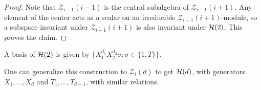 \begin{proof}
  Note that $\mathcal{Z}_{i - 1}(i - 1)$
  is the central subalgebra of
  $\mathcal{Z}_{i - 1}(i + 1)$. Any element
  of the center acts as a scalar
  on an irreducible $\mathcal{Z}_{i - 1}(i + 1)$-module,
  so a subspace invariant under
  $\mathcal{Z}_{i - 1}(i + 1)$ is
  also invariant under $\mathcal{H}(2)$. This
  proves the claim.
\end{proof}

\begin{remark}
  A basis of $\mathcal{H}(2)$ is
  given by
  $\{X_1^{d_1} X_2^{d_2} \sigma : \sigma \in \{1, T\}\}$.
\end{remark}

\begin{remark}
  One can generalize this construction
  to $\mathcal{Z}_{i}(d)$ to get
  $\mathcal{H}(d)$, with
  generators $X_1, \ldots, X_d$ and
  $T_1, \ldots, T_{d - 1}$, with similar
  relations.
\end{remark}


